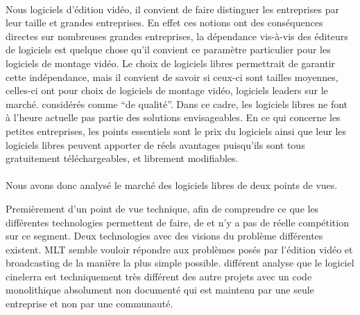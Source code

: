 \paragraph{}

Nous %
logiciels d'édition vidéo, il convient  de faire distinguer les
entreprises par leur taille %
et grandes entreprises. En effet ces notions ont
des conséquences directes sur %
nombreuses  grandes entreprises, la dépendance vis-à-vis des éditeurs
de logiciels est quelque chose qu'il convient %
ce paramètre %
particulier pour les logiciels de montage vidéo. Le choix de logiciels libres
permettrait de garantir cette indépendance, mais il convient de savoir
si ceux-ci sont %
tailles moyennes, celles-ci ont pour %
choix de logiciels de montage vidéo, %
logiciels leaders sur le marché. %
considérés comme ``de qualité''. Dans ce cadre, les logiciels libres ne
font à l'heure actuelle pas partie des solutions envisageables. En ce qui
concerne les petites entreprises, les points essentiels sont le prix du
logiciels ainsi que leur %
les logiciels libres peuvent apporter de réels avantages puisqu'ils sont
tous gratuitement téléchargeables, et librement modifiables.


\paragraph{}

Nous avons donc analysé le marché des logiciels libres de deux points
de vues.

Premièrement d'un point de vue technique, afin de comprendre ce que les
différentes technologies permettent de faire, de %
et %
n'y a pas de réelle compétition sur ce segment. Deux technologies avec des
visions du problème différentes existent. MLT semble vouloir répondre
aux problèmes posés par l'édition vidéo et broadcasting de la manière
la plus simple possible. %
différent %
analyse que le logiciel cinelerra est techniquement très différent
des autre projets%
avec un code monolithique absolument non documenté
qui est maintenu par une seule entreprise et non par une communauté.

